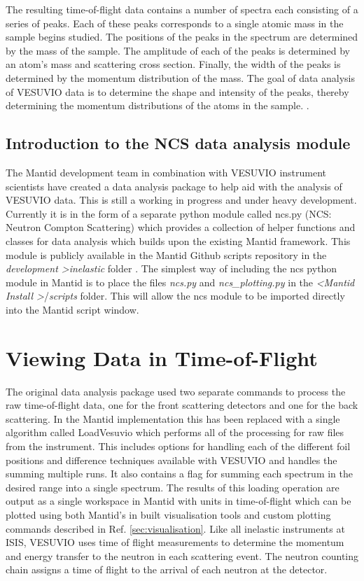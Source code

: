 \documentclass[paper=a4, fontsize=11pt]{scrartcl}	%
\numberwithin{equation}{section}															%
\numberwithin{figure}{section}																%
\numberwithin{table}{section}
\begin{document}
The resulting time-of-flight data contains a number of spectra each consisting of a series of peaks. Each of these peaks corresponds to a single atomic mass in the sample begins studied. The positions of the peaks in the spectrum are determined by the mass of the sample. The amplitude of each of the peaks is determined by an atom's mass and scattering cross section. Finally, the width of the peaks is determined by the momentum distribution of the mass. The goal of data analysis of VESUVIO data is to determine the shape and intensity of the peaks, thereby determining the momentum distributions of the atoms in the sample. \cite{mayers2010user}.

\subsection{Introduction to the NCS data analysis module}
\label{subsec:intro-data-analysis}
The Mantid development team in combination with VESUVIO instrument scientists have created a data analysis package to help aid with the analysis of VESUVIO data. This is still a working in progress and under heavy development. Currently it is in the form of a separate python module called ncs.py (NCS: Neutron Compton Scattering) which provides a collection of helper functions and classes for data analysis which builds upon the existing Mantid framework. This module is publicly available in the Mantid Github scripts repository in the \textit{development \textgreater  inelastic} folder \cite{mantidgithubncs}. The simplest way of including the ncs python module in Mantid is to place the files \textit{ncs.py} and \textit{ncs\_plotting.py} in the \textit{ \textless Mantid Install \textgreater }/\textit{scripts} folder. This will allow the ncs module to be imported directly into the Mantid script window.

\section{Viewing Data in Time-of-Flight}
\label{sec:viewtof}
The original data analysis package \cite{mayers2010user} used two separate commands to process the raw time-of-flight data, one for the front scattering detectors and one for the back scattering. In the Mantid implementation this has been replaced with a single algorithm called LoadVesuvio which performs all of the processing for raw files from the instrument. This includes options for handling each of the different foil positions and difference techniques available with VESUVIO \citep{schooneveld2006foil, mayers2004vesuvio} and handles the summing multiple runs. It also contains a flag for summing each spectrum in the desired range into a single spectrum. The results of this loading operation are output as a single workspace in Mantid with units in time-of-flight which can be plotted using both Mantid's in built visualisation tools and custom plotting commands described in Ref. \ref{sec:visualisation}. Like all inelastic instruments at ISIS, VESUVIO uses time of flight measurements to determine the momentum and energy transfer to the neutron in each scattering event. The neutron counting chain assigns a time of flight to the arrival of each neutron at the detector.
\end{document}

